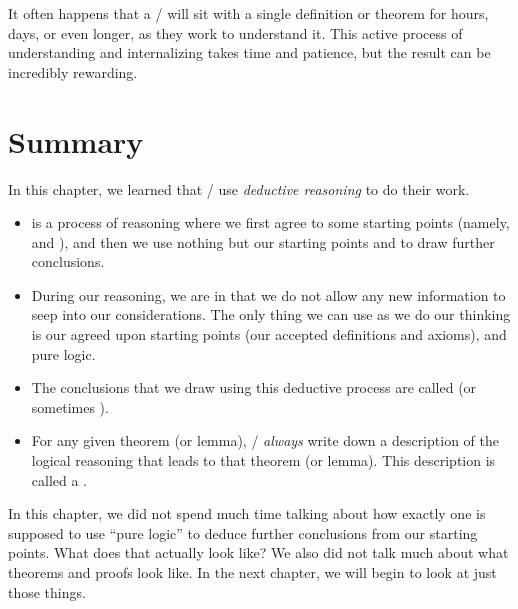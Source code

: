 \documentclass[../../../main.tex]{subfiles}
\begin{document}
It often happens that a \mather/ will sit with a single definition or theorem for hours, days, or even longer, as they work to understand it. This active process of understanding and internalizing takes time and patience, but the result can be incredibly rewarding.


\section{Summary}

In this chapter, we learned that \mathers/ use \emph{deductive reasoning} to do their work. 

\begin{itemize}

  \item {} is a process of reasoning where we first agree to some starting points (namely,  and ), and then we use nothing but our starting points and  to draw further conclusions.
  
  \item During our reasoning, we are  in that we do not allow any new information to seep into our considerations. The only thing we can use as we do our thinking is our agreed upon starting points (our accepted definitions and axioms), and pure logic.

  \item The conclusions that we draw using this deductive process are called  (or sometimes ). 
  
  \item For any given theorem (or lemma), \mathers/ \emph{always} write down a description of the logical reasoning that leads to that theorem (or lemma). This description is called a .
  
\end{itemize}

In this chapter, we did not spend much time talking about how exactly one is supposed to use ``pure logic'' to deduce further conclusions from our starting points. What does that actually look like? We also did not talk much about what theorems and proofs look like. In the next chapter, we will begin to look at just those things. 
\end{document}

